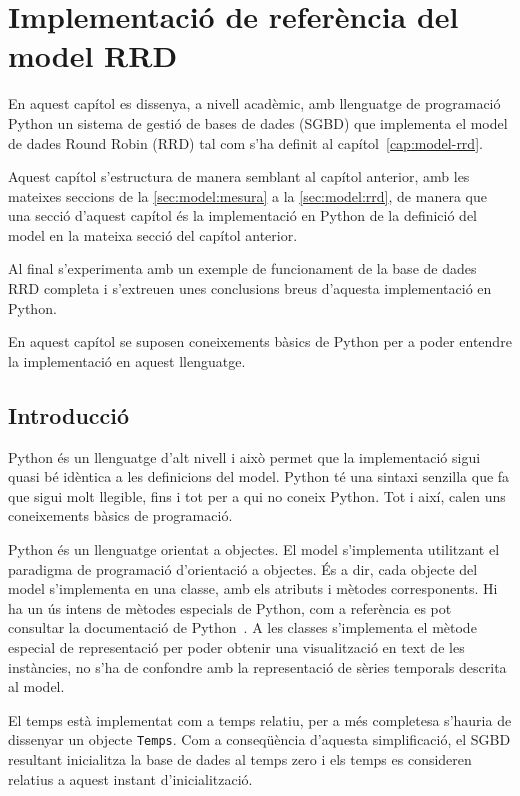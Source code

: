 \chapter{Implementació  de referència del model RRD}
\label{cap:roundrobinson}

En aquest capítol es dissenya, a nivell acadèmic, amb llenguatge de programació Python un sistema de gestió de bases de dades (SGBD) que implementa el model de dades Round Robin (RRD) tal com s'ha definit al capítol~\ref{cap:model-rrd}.

Aquest capítol s'estructura de manera semblant al capítol anterior, amb les mateixes seccions de la \ref{sec:model:mesura} a la \ref{sec:model:rrd}, de manera que una secció d'aquest capítol és la implementació en Python de la definició del model en la mateixa secció del capítol anterior.
 
Al final s'experimenta amb un exemple de funcionament de la base de dades RRD completa i s'extreuen unes conclusions breus d'aquesta implementació en Python.

En aquest capítol se suposen coneixements bàsics de Python per a poder entendre la implementació en aquest llenguatge.

\section{Introducció}

Python és un llenguatge d'alt nivell i això permet que la implementació sigui quasi bé idèntica a les definicions del model.
Python té una sintaxi senzilla que fa que sigui molt llegible, fins i tot per a qui no coneix Python. Tot i així, calen uns coneixements bàsics de programació.

Python és un llenguatge orientat a objectes. El model s'implementa utilitzant el paradigma de programació d'orientació a objectes. És a dir, cada objecte del model s'implementa en una classe, amb els atributs i mètodes corresponents. Hi ha un ús intens de mètodes especials de Python, com a referència es pot consultar la documentació de Python~\cite{pythondoc}.
A les classes s'implementa el mètode especial de representació per poder obtenir una visualització en text de les instàncies, no s'ha de confondre amb  la representació de sèries temporals descrita al model.


El temps està implementat com a temps relatiu, per a més completesa s'hauria de dissenyar un objecte \verb+Temps+. Com a conseqüència d'aquesta simplificació, el SGBD resultant inicialitza la base de dades  al temps zero i els temps es consideren relatius a aquest instant d'inicialització. 


